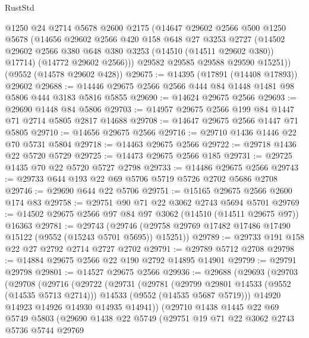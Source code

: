 \begin{lexlean}{RustStd}
\begin{coremodule}
        @1250
        @24
        @2714
        @5678
        @2600
        @2175
        (@14647
          @29602
          @2566
          @500
          @1250
          @5678
          (@14656
            @29602
            @2566
            @420
            @158
            @648
            @27
            @3253
            @2727
            (@14502 @29602 @2566 @380 @648 @380 @3253 (@14510 (@14511 @29602 @380)) @17714)
            (@14772 @29602 @2566)))
        @29582
        @29585
        @29588
        @29590
        @15251))
    (@9552 (@14578 @29602 @428))
@29675 := @14395 (@17891 (@14408 @17893)) @29602
@29688 := @14446 @29675 @2566 @2566 @444 @84 @1448 @1481 @98 @5806 @444 @3183 @5816 @5855
@29690 := @14624 @29675 @2566
@29693 := @29690 @1448 @84 @5806
@29703 := @14957 @29675 @2566 @199 @84 @1447 @71 @2714 @5805 @2817 @14688
@29708 := @14647 @29675 @2566 @1447 @71 @5805
@29710 := @14656 @29675 @2566
@29716 := @29710 @1436 @1446 @22 @70 @5731 @5804
@29718 := @14463 @29675 @2566
@29722 := @29718 @1436 @22 @5720 @5729
@29725 := @14473 @29675 @2566 @185
@29731 := @29725 @1435 @70 @22 @5720 @5727 @2798
@29733 := @14486 @29675 @2566
@29743 := @29733 @644 @193 @22 @69 @5706 @5719 @5726 @2702 @5686 @2708
@29746 := @29690 @644 @22 @5706
@29751 := @15165 @29675 @2566 @2600 @174 @83
@29758 := @29751 @90 @71 @22 @3062 @2743 @5694 @5701
@29769 := @14502 @29675 @2566 @97 @84 @97 @3062 (@14510 (@14511 @29675 @97)) @16363
@29781 := @29743
    (@29746 (@29758 @29769 @17482 @17486 @17490 @15122 (@9552 (@15243 @5701 @5695)) @15251))
@29789 := @29733 @191 @158 @22 @27 @2792 @2714 @2727 @2702
@29791 := @29789 @5712 @2708
@29798 := @14884 @29675 @2566 @22 @190 @2792 @14895 @14901
@29799 := @29791 @29798
@29801 := @14527 @29675 @2566
@29936 := @29688
    (@29693
      (@29703
        (@29708
          (@29716
            (@29722
              (@29731
                (@29781
                  (@29799 @29801 @14533 (@9552 (@14535 @5713 @2714)))
                  @14533
                  (@9552 (@14535 @5687 @5719)))
                @14920
                @14923
                @14926
                @14930
                @14935
                @14941))
            (@29710
              @1438
              @1445
              @22
              @69
              @5749
              @5803
              (@29690
                @1438
                @22
                @5749
                (@29751
                  @19
                  @71
                  @22
                  @3062
                  @2743
                  @5736
                  @5744
                  @29769

\end{coremodule}
\end{lexlean}
